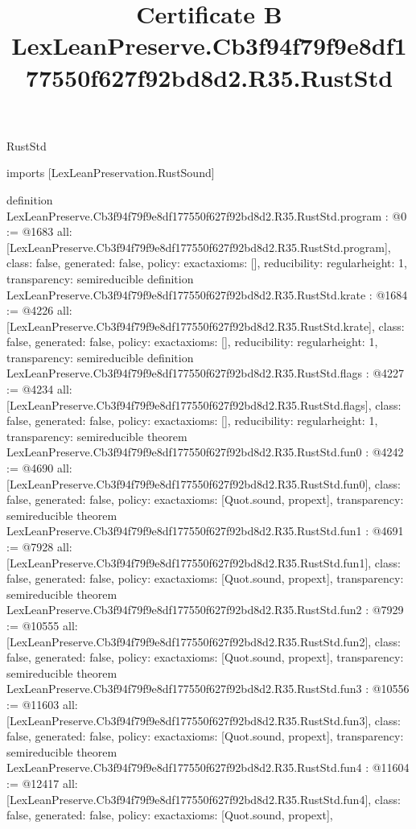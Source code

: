 \begin{lexlean}{RustStd}
\title{Certificate B LexLeanPreserve.Cb3f94f79f9e8df177550f627f92bd8d2.R35.RustStd}
\begin{coremodule}
imports [LexLeanPreservation.RustSound]

definition LexLeanPreserve.Cb3f94f79f9e8df177550f627f92bd8d2.R35.RustStd.program : @0 := @1683 {
  all: [LexLeanPreserve.Cb3f94f79f9e8df177550f627f92bd8d2.R35.RustStd.program],
  class: false,
  generated: false,
  policy: exact{axioms: []},
  reducibility: regular{height: 1},
  transparency: semireducible
}
definition LexLeanPreserve.Cb3f94f79f9e8df177550f627f92bd8d2.R35.RustStd.krate : @1684 := @4226 {
  all: [LexLeanPreserve.Cb3f94f79f9e8df177550f627f92bd8d2.R35.RustStd.krate],
  class: false,
  generated: false,
  policy: exact{axioms: []},
  reducibility: regular{height: 1},
  transparency: semireducible
}
definition LexLeanPreserve.Cb3f94f79f9e8df177550f627f92bd8d2.R35.RustStd.flags : @4227 := @4234 {
  all: [LexLeanPreserve.Cb3f94f79f9e8df177550f627f92bd8d2.R35.RustStd.flags],
  class: false,
  generated: false,
  policy: exact{axioms: []},
  reducibility: regular{height: 1},
  transparency: semireducible
}
theorem LexLeanPreserve.Cb3f94f79f9e8df177550f627f92bd8d2.R35.RustStd.fun0 : @4242 := @4690 {
  all: [LexLeanPreserve.Cb3f94f79f9e8df177550f627f92bd8d2.R35.RustStd.fun0],
  class: false,
  generated: false,
  policy: exact{axioms: [Quot.sound, propext]},
  transparency: semireducible
}
theorem LexLeanPreserve.Cb3f94f79f9e8df177550f627f92bd8d2.R35.RustStd.fun1 : @4691 := @7928 {
  all: [LexLeanPreserve.Cb3f94f79f9e8df177550f627f92bd8d2.R35.RustStd.fun1],
  class: false,
  generated: false,
  policy: exact{axioms: [Quot.sound, propext]},
  transparency: semireducible
}
theorem LexLeanPreserve.Cb3f94f79f9e8df177550f627f92bd8d2.R35.RustStd.fun2 : @7929 := @10555 {
  all: [LexLeanPreserve.Cb3f94f79f9e8df177550f627f92bd8d2.R35.RustStd.fun2],
  class: false,
  generated: false,
  policy: exact{axioms: [Quot.sound, propext]},
  transparency: semireducible
}
theorem LexLeanPreserve.Cb3f94f79f9e8df177550f627f92bd8d2.R35.RustStd.fun3 : @10556 := @11603 {
  all: [LexLeanPreserve.Cb3f94f79f9e8df177550f627f92bd8d2.R35.RustStd.fun3],
  class: false,
  generated: false,
  policy: exact{axioms: [Quot.sound, propext]},
  transparency: semireducible
}
theorem LexLeanPreserve.Cb3f94f79f9e8df177550f627f92bd8d2.R35.RustStd.fun4 : @11604 := @12417 {
  all: [LexLeanPreserve.Cb3f94f79f9e8df177550f627f92bd8d2.R35.RustStd.fun4],
  class: false,
  generated: false,
  policy: exact{axioms: [Quot.sound, propext]},
}
\end{coremodule}
\end{lexlean}
